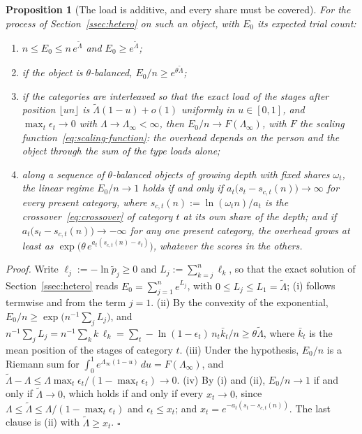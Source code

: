 \documentclass{article}
\newtheorem{proposition}{Proposition}
\begin{document}
\begin{proposition}[The load is additive, and every share must be covered]\label{prop:loads}
For the process of Section~\ref{ssec:hetero} on such an object, with $E_0$ its expected trial count:
\begin{enumerate}
  \item[(i)] $n \leq E_0 \leq n\,e^{\widetilde{\Lambda}}$ and $E_0 \geq e^{\widetilde{\Lambda}}$;
  \item[(ii)] if the object is $\theta$-balanced, $E_0/n \geq e^{\theta\widetilde{\Lambda}}$;
  \item[(iii)] if the categories are interleaved so that the exact load of the stages after position $\lfloor un \rfloor$ is $\widetilde{\Lambda}(1 - u) + o(1)$ uniformly in $u \in [0, 1]$, and $\max_t\epsilon_t \to 0$ with $\Lambda \to \Lambda_\infty < \infty$, then $E_0/n \to F(\Lambda_\infty)$, with $F$ the scaling function~\eqref{eq:scaling-function}: the overhead depends on the person and the object through the sum of the type loads alone;
  \item[(iv)] along a sequence of $\theta$-balanced objects of growing depth with fixed shares $\omega_t$, the linear regime $E_0/n \to 1$ holds if and only if $a_t\big(s_t - s_{c,t}(n)\big) \to \infty$ for every present category, where $s_{c,t}(n) := \ln(\omega_t n)/a_t$ is the crossover~\eqref{eq:crossover} of category $t$ at its own share of the depth; and if $a_t\big(s_t - s_{c,t}(n)\big) \to -\infty$ for any one present category, the overhead grows at least as $\exp\big(\theta\,e^{a_t(s_{c,t}(n) - s_t)}\big)$, whatever the scores in the others.
\end{enumerate}
\end{proposition}

\noindent\textit{Proof.} Write $\ell_j := -\ln\widetilde{p}_j \geq 0$ and $L_j := \sum_{k=j}^{n}\ell_k$, so that the exact solution of Section~\ref{ssec:hetero} reads $E_0 = \sum_{j=1}^{n} e^{L_j}$, with $0 \leq L_j \leq L_1 = \widetilde{\Lambda}$; (i) follows termwise and from the term $j = 1$. (ii) By the convexity of the exponential, $E_0/n \geq \exp\big(n^{-1}\sum_j L_j\big)$, and $n^{-1}\sum_j L_j = n^{-1}\sum_k k\,\ell_k = \sum_t -\ln(1 - \epsilon_t)\,n_t\bar{k}_t/n \geq \theta\widetilde{\Lambda}$, where $\bar{k}_t$ is the mean position of the stages of category $t$. (iii) Under the hypothesis, $E_0/n$ is a Riemann sum for $\int_0^1 e^{\Lambda_\infty(1-u)}\,du = F(\Lambda_\infty)$, and $\widetilde{\Lambda} - \Lambda \leq \Lambda\max_t\epsilon_t/(1 - \max_t\epsilon_t) \to 0$. (iv) By (i) and (ii), $E_0/n \to 1$ if and only if $\widetilde{\Lambda} \to 0$, which holds if and only if every $x_t \to 0$, since $\Lambda \leq \widetilde{\Lambda} \leq \Lambda/(1 - \max_t\epsilon_t)$ and $\epsilon_t \leq x_t$; and $x_t = e^{-a_t(s_t - s_{c,t}(n))}$. The last clause is (ii) with $\widetilde{\Lambda} \geq x_t$. $\square$
\end{document}
